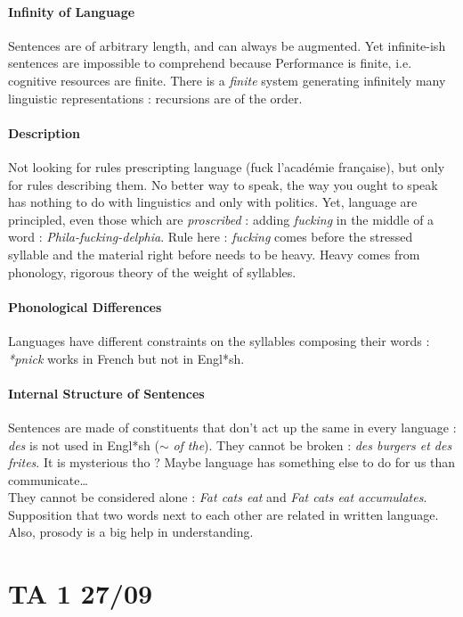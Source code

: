 \documentclass{cours}
\begin{document}
    \subsection{Infinity of Language}
        Sentences are of arbitrary length, and can always be augmented. Yet infinite-ish sentences are impossible to comprehend because Performance is finite, i.e. cognitive resources are finite. There is a \textit{finite} system generating infinitely many linguistic representations : recursions are of the order.
    \subsection{Description}
        Not looking for rules prescripting language (fuck l'académie française), but only for rules describing them. No better way to speak, the way you ought to speak has nothing to do with linguistics and only with politics. Yet, language are principled, even those which are \textit{proscribed} : adding \textit{fucking} in the middle of a word : \textit{Phila-fucking-delphia}. Rule here : \textit{fucking} comes before the stressed syllable and the material right before needs to be heavy. Heavy comes from phonology, rigorous theory of the weight of syllables. 
    \subsection{Phonological Differences}
        Languages have different constraints on the syllables composing their words : \textit{*pnick} works in French but not in Engl*sh.
    \subsection{Internal Structure of Sentences}
        Sentences are made of constituents that don't act up the same in every language : \textit{des} is not used in Engl*sh ($\sim$ \textit{of the}). They cannot be broken : \textit{des burgers et des frites}. It is mysterious tho ? Maybe language has something else to do for us than communicate\ldots\\
        They cannot be considered alone : \textit{Fat cats eat} and \textit{Fat cats eat accumulates}. Supposition that two words next to each other are related in written language. Also, prosody is a big help in understanding. 

\part{TA 1 27/09}
\end{document}

